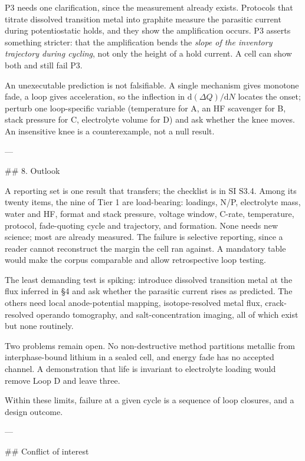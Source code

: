 P3 needs one clarification, since the measurement already exists. Protocols that titrate dissolved transition metal into graphite measure the parasitic current during potentiostatic holds,\cite{meunier2022electrochemical} and they show the amplification occurs. P3 asserts something stricter: that the amplification bends the \emph{slope of the inventory trajectory during cycling}, not only the height of a hold current. A cell can show both and still fail P3.

An unexecutable prediction is not falsifiable. A single mechanism gives monotone fade, a loop gives acceleration, so the inflection in $\mathrm{d}(\Delta Q)/\mathrm{d}N$ locates the onset; perturb one loop-specific variable (temperature for A, an HF scavenger for B, stack pressure for C, electrolyte volume for D) and ask whether the knee moves.\cite{wang2026interplay,louli2019exploring} An insensitive knee is a counterexample, not a null result.

---

## 8. Outlook

A reporting set is one result that transfers; the checklist is in SI S3.4. Among its twenty items, the nine of Tier 1 are load-bearing: loadings, N/P, electrolyte mass, water and HF, format and stack pressure, voltage window, C-rate, temperature, protocol, fade-quoting cycle and trajectory, and formation.\cite{dechent2021estimation} None needs new science; most are already measured. The failure is selective reporting, since a reader cannot reconstruct the margin the cell ran against. A mandatory table would make the corpus comparable and allow retrospective loop testing.

The least demanding test is spiking: introduce dissolved transition metal at the flux inferred in \S4 and ask whether the parasitic current rises as predicted. The others need local anode-potential mapping, isotope-resolved metal flux, crack-resolved operando tomography, and salt-concentration imaging, all of which exist but none routinely.

Two problems remain open. No non-destructive method partitions metallic from interphase-bound lithium in a sealed cell, and energy fade has no accepted channel. A demonstration that life is invariant to electrolyte loading would remove Loop D and leave three.

Within these limits, failure at a given cycle is a sequence of loop closures, and a design outcome.

---

## Conflict of interest

